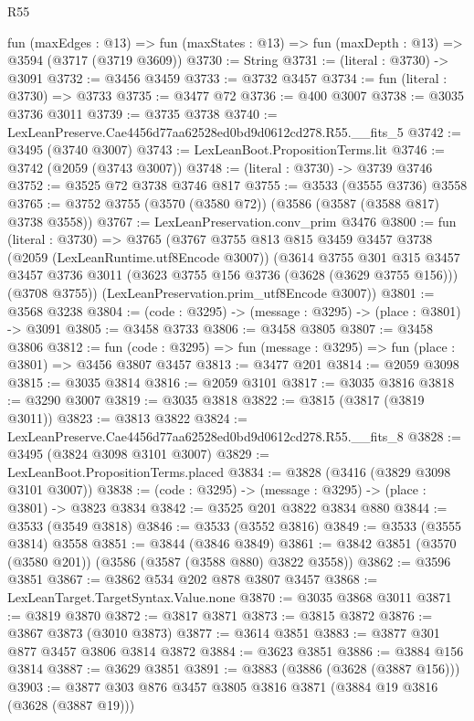 \begin{lexlean}{R55}
\begin{coremodule}
  fun (maxEdges : @13) =>
  fun (maxStates : @13) => fun (maxDepth : @13) => @3594 (@3717 (@3719 @3609))
@3730 := String
@3731 := (literal : @3730) -> @3091
@3732 := @3456 @3459
@3733 := @3732 @3457
@3734 := fun (literal : @3730) => @3733
@3735 := @3477 @72
@3736 := @400 @3007
@3738 := @3035 @3736 @3011
@3739 := @3735 @3738
@3740 := LexLeanPreserve.Cae4456d77aa62528ed0bd9d0612cd278.R55.__fits_5
@3742 := @3495 (@3740 @3007)
@3743 := LexLeanBoot.PropositionTerms.lit
@3746 := @3742 (@2059 (@3743 @3007))
@3748 := (literal : @3730) -> @3739 @3746
@3752 := @3525 @72 @3738 @3746 @817
@3755 := @3533 (@3555 @3736) @3558
@3765 := @3752 @3755 (@3570 (@3580 @72)) (@3586 (@3587 (@3588 @817) @3738 @3558))
@3767 := LexLeanPreservation.conv_prim @3476
@3800 := fun (literal : @3730) =>
  @3765
    (@3767
      @3755
      @813
      @815
      @3459
      @3457
      @3738
      (@2059 (LexLeanRuntime.utf8Encode @3007))
      (@3614
        @3755
        @301
        @315
        @3457
        @3457
        @3736
        @3011
        (@3623 @3755 @156 @3736 (@3628 (@3629 @3755 @156)))
        (@3708 @3755))
      (LexLeanPreservation.prim_utf8Encode @3007))
@3801 := @3568 @3238
@3804 := (code : @3295) -> (message : @3295) -> (place : @3801) -> @3091
@3805 := @3458 @3733
@3806 := @3458 @3805
@3807 := @3458 @3806
@3812 := fun (code : @3295) => fun (message : @3295) => fun (place : @3801) => @3456 @3807 @3457
@3813 := @3477 @201
@3814 := @2059 @3098
@3815 := @3035 @3814
@3816 := @2059 @3101
@3817 := @3035 @3816
@3818 := @3290 @3007
@3819 := @3035 @3818
@3822 := @3815 (@3817 (@3819 @3011))
@3823 := @3813 @3822
@3824 := LexLeanPreserve.Cae4456d77aa62528ed0bd9d0612cd278.R55.__fits_8
@3828 := @3495 (@3824 @3098 @3101 @3007)
@3829 := LexLeanBoot.PropositionTerms.placed
@3834 := @3828 (@3416 (@3829 @3098 @3101 @3007))
@3838 := (code : @3295) -> (message : @3295) -> (place : @3801) -> @3823 @3834
@3842 := @3525 @201 @3822 @3834 @880
@3844 := @3533 (@3549 @3818)
@3846 := @3533 (@3552 @3816)
@3849 := @3533 (@3555 @3814) @3558
@3851 := @3844 (@3846 @3849)
@3861 := @3842 @3851 (@3570 (@3580 @201)) (@3586 (@3587 (@3588 @880) @3822 @3558))
@3862 := @3596 @3851
@3867 := @3862 @534 @202 @878 @3807 @3457
@3868 := LexLeanTarget.TargetSyntax.Value.none
@3870 := @3035 @3868 @3011
@3871 := @3819 @3870
@3872 := @3817 @3871
@3873 := @3815 @3872
@3876 := @3867 @3873 (@3010 @3873)
@3877 := @3614 @3851
@3883 := @3877 @301 @877 @3457 @3806 @3814 @3872
@3884 := @3623 @3851
@3886 := @3884 @156 @3814
@3887 := @3629 @3851
@3891 := @3883 (@3886 (@3628 (@3887 @156)))
@3903 := @3877 @303 @876 @3457 @3805 @3816 @3871 (@3884 @19 @3816 (@3628 (@3887 @19)))

\end{coremodule}
\end{lexlean}

